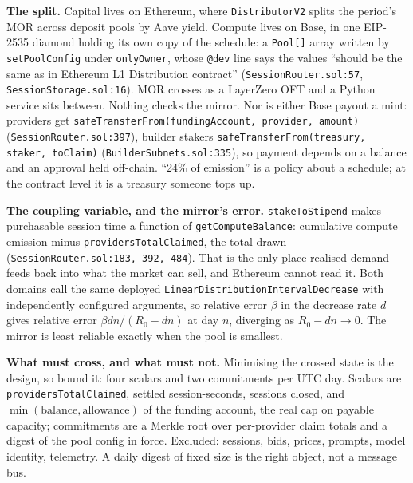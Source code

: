 \documentclass[10pt,a4paper]{article}
\newcommand{\code}[1]{\texttt{\small #1}}
\begin{document}

\noindent\textbf{The split.}
Capital lives on Ethereum, where \code{DistributorV2} splits the period's MOR across deposit pools by
Aave yield. Compute lives on Base, in one EIP-2535 diamond holding its own copy of the schedule: a
\code{Pool[]} array written by \code{setPoolConfig} under \code{onlyOwner}, whose \code{@dev} line
says the values ``should be the same as in Ethereum L1 Distribution contract''
(\code{SessionRouter.sol:57}, \code{SessionStorage.sol:16}). MOR crosses as a LayerZero
OFT and a Python service sits between. Nothing checks the mirror. Nor is either Base payout a mint:
providers get \code{safeTransferFrom(fundingAccount, provider, amount)}
(\code{SessionRouter.sol:397}), builder stakers \code{safeTransferFrom(treasury, staker, toClaim)}
(\code{BuilderSubnets.sol:335}), so payment depends on a balance and an approval held off-chain.
``24\% of emission'' is a policy about a schedule; at the contract level it is a treasury someone
tops up.

\vspace{0.35ex}
\noindent\textbf{The coupling variable, and the mirror's error.}
\code{stakeToStipend} makes purchasable session time a function of \code{getComputeBalance}:
cumulative compute emission minus \code{providersTotalClaimed}, the total drawn
(\code{SessionRouter.sol:183, 392, 484}). That is the only place realised demand feeds back into what
the market can sell, and Ethereum cannot read it. Both domains call the same deployed
\code{LinearDistribution\discretionary{-}{}{}IntervalDecrease} with independently configured
arguments, so relative error $\beta$ in the decrease rate $d$ gives relative error
$\beta dn/(R_0-dn)$ at day $n$, diverging as $R_0-dn\to 0$.
The mirror is least reliable exactly when the pool is smallest.

\vspace{0.35ex}
\noindent\textbf{What must cross, and what must not.}
Minimising the crossed state is the design, so bound it: four scalars and two commitments per UTC
day. Scalars are \code{providersTotalClaimed}, settled session-seconds, sessions closed, and
$\min(\text{balance},\text{allowance})$ of the funding account, the real cap on payable capacity;
commitments are a Merkle root over per-provider claim totals and a digest of the pool config in
force. Excluded: sessions, bids, prices, prompts, model identity, telemetry. A daily digest of fixed
size is the right object, not a message bus.
\end{document}
